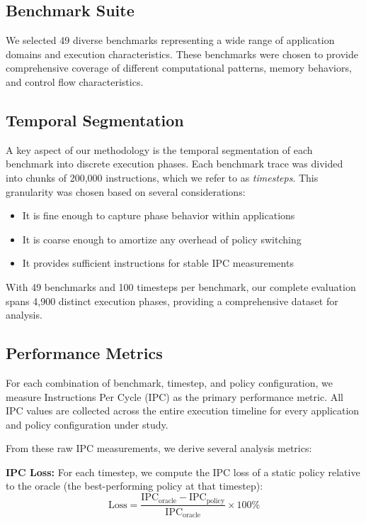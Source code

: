\documentclass[conference]{IEEEtran}
\begin{document}
\subsection{Benchmark Suite}

We selected 49 diverse benchmarks representing a wide range of application domains and execution characteristics. These benchmarks were chosen to provide comprehensive coverage of different computational patterns, memory behaviors, and control flow characteristics.

\subsection{Temporal Segmentation}

A key aspect of our methodology is the temporal segmentation of each benchmark into discrete execution phases. Each benchmark trace was divided into chunks of 200,000 instructions, which we refer to as \textit{timesteps}. This granularity was chosen based on several considerations:

\begin{itemize}
\item It is fine enough to capture phase behavior within applications
\item It is coarse enough to amortize any overhead of policy switching
\item It provides sufficient instructions for stable IPC measurements
\end{itemize}

With 49 benchmarks and 100 timesteps per benchmark, our complete evaluation spans 4,900 distinct execution phases, providing a comprehensive dataset for analysis.

\subsection{Performance Metrics}

For each combination of benchmark, timestep, and policy configuration, we measure Instructions Per Cycle (IPC) as the primary performance metric. 
All IPC values are collected across the entire execution timeline for 
every application and policy configuration under study.

From these raw IPC measurements, we derive several analysis metrics:

\textbf{IPC Loss:} For each timestep, we compute the IPC loss of a static policy relative to the oracle (the best-performing policy at that timestep):
\begin{equation}
\text{Loss} = \frac{\text{IPC}_{\text{oracle}} - \text{IPC}_{\text{policy}}}{\text{IPC}_{\text{oracle}}} \times 100\%
\end{equation}
\end{document}
